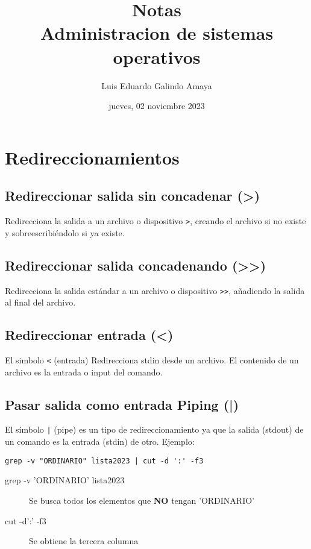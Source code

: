 \documentclass[11pt]{article}
\author{Luis Eduardo Galindo Amaya}
\date{jueves, 02 noviembre 2023}
\title{Notas\\\medskip
\large Administracion de sistemas operativos}
\begin{document}
\maketitle
\setcounter{tocdepth}{2}
\tableofcontents


\section{Redireccionamientos}
\label{sec:orgfb8f067}
\subsection{Redireccionar salida sin concadenar (>)}
\label{sec:org17c35cf}
Redirecciona la salida a un archivo o dispositivo \texttt{>}, creando el archivo
si no existe y sobreescribiéndolo si ya existe.

\subsection{Redireccionar salida concadenando (>>)}
\label{sec:org18da9ea}
Redirecciona la salida estándar a un archivo o dispositivo \texttt{>>}, añadiendo
la salida al final del archivo.

\subsection{Redireccionar entrada (<)}
\label{sec:org0889e7f}
El simbolo \texttt{<} (entrada) Redirecciona stdin desde un archivo. El
contenido de un archivo es la entrada o input del comando. 

\subsection{Pasar salida como entrada Piping (|)}
\label{sec:orga7e941d}
El símbolo \texttt{|} (pipe) es un tipo de redireccionamiento ya que la salida
(stdout) de un comando es la entrada (stdin) de otro. Ejemplo:

\lstset{language=shell,label= ,caption= ,captionpos=b,numbers=none}
\begin{lstlisting}
grep -v "ORDINARIO" lista2023 | cut -d ':' -f3 
\end{lstlisting}

\begin{description}
\item[{grep -v ’ORDINARIO’ lista2023}] Se busca todos los elementos que \textbf{NO}
tengan ’ORDINARIO’

\item[{cut -d’:’ -f3}] Se obtiene la tercera columna
\end{description}
\end{document}
